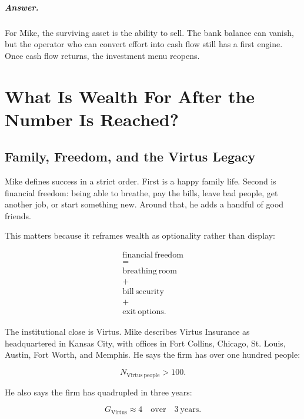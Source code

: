 \documentclass[11pt,oneside]{book}
\begin{document}
\paragraph{Answer.}
For Mike, the surviving asset is the ability to sell. The bank balance can vanish, but the operator who can convert effort into cash flow still has a first engine. Once cash flow returns, the investment menu reopens.

\chapter{What Is Wealth For After the Number Is Reached?}

\section{Family, Freedom, and the Virtus Legacy}

Mike defines success in a strict order. First is a happy family life. Second is financial freedom: being able to breathe, pay the bills, leave bad people, get another job, or start something new. Around that, he adds a handful of good friends.

This matters because it reframes wealth as optionality rather than display:

\begin{equation}
\begin{gathered}
\mathrm{financial\ freedom}\\
=\\
\mathrm{breathing\ room}\\
+\\
\mathrm{bill\ security}\\
+\\
\mathrm{exit\ options}.
\end{gathered}
\end{equation}

The institutional close is Virtus. Mike describes Virtus Insurance as headquartered in Kansas City, with offices in Fort Collins, Chicago, St. Louis, Austin, Fort Worth, and Memphis. He says the firm has over one hundred people:

\begin{equation}
N_{\mathrm{Virtus\ people}}>100.
\end{equation}

He also says the firm has quadrupled in three years:

\begin{equation}
G_{\mathrm{Virtus}}\approx 4
\quad \mathrm{over}\quad
3\ \mathrm{years}.
\end{equation}
\end{document}
